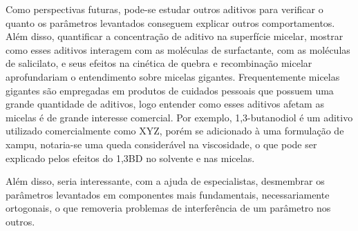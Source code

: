 		Como perspectivas futuras, pode-se estudar outros aditivos para verificar o quanto os parâmetros levantados conseguem explicar outros comportamentos. Além disso, quantificar a concentração de aditivo na superfície micelar, mostrar como esses aditivos interagem com as moléculas de surfactante, com as moléculas de salicilato, e seus efeitos na cinética de quebra e recombinação micelar aprofundariam o entendimento sobre micelas gigantes. Frequentemente micelas gigantes são empregadas em produtos de cuidados pessoais que possuem uma grande quantidade de aditivos, logo entender como esses aditivos afetam as micelas é de grande interesse comercial. Por exemplo, 1,3-butanodiol é um aditivo utilizado comercialmente como XYZ, porém se adicionado à uma formulação de xampu, notaria-se uma queda considerável na viscosidade, o que pode ser explicado pelos efeitos do 1,3BD no solvente e nas micelas.
		
		Além disso, seria interessante, com a ajuda de especialistas, desmembrar os parâmetros levantados em componentes mais fundamentais, necessariamente ortogonais, o que removeria problemas de interferência de um parâmetro nos outros.
		
